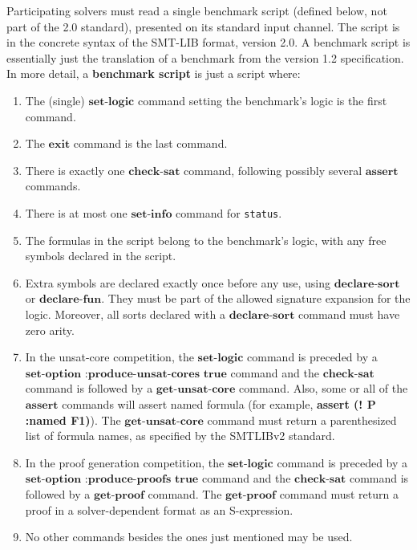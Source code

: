 \documentclass[12pt]{article}
\newcommand{\akey}[1]{\textbf{#1}}
\begin{document}
%
Participating solvers must read a single benchmark script (defined
below, not part of the 2.0 standard), presented on its standard input
channel. The script is in the concrete syntax of the SMT-LIB format,
version 2.0.  A benchmark script is essentially just the translation
of a benchmark from the version 1.2 specification.  In more detail, a
\textbf{benchmark script} is just a script where:

\begin{enumerate}
\item The (single) $\akey{set-logic}$ command setting the benchmark's
logic is the first command.
\item The $\akey{exit}$ command is the last command.
\item There is exactly one $\akey{check-sat}$ command,
following possibly several $\akey{assert}$ commands.
\item There is at most one $\akey{set-info}$ command for \texttt{status}.
\item The formulas in the script belong to the benchmark's logic, with
any free symbols declared in the script.
\item Extra symbols are declared exactly once before any
  use, using $\akey{declare-sort}$
  or $\akey{declare-fun}$.
  They must be part of the allowed signature expansion for the logic.
  Moreover, all sorts declared with a $\akey{declare-sort}$ command must have zero arity.
\item In the unsat-core competition, the $\akey{set-logic}$ command is preceded by a 
$\akey{set-option :produce-unsat-cores true}$ command and the 
$\akey{check-sat}$ command is followed by a $\akey{get-unsat-core}$ command.
Also, some or all of the $\akey{assert}$ commands will assert named formula
(for example, \akey{assert (! P :named F1)}). The $\akey{get-unsat-core}$
command must return a parenthesized list of formula names, as specified by the 
SMTLIBv2 standard.
\item In the proof generation competition, the $\akey{set-logic}$ command is preceded by a 
$\akey{set-option :produce-proofs true}$ command and the 
$\akey{check-sat}$ command is followed by a $\akey{get-proof}$ command.
The $\akey{get-proof}$ command must return a proof in a solver-dependent format as an
S-expression.
\item No other commands besides the ones just mentioned may be used.

\end{enumerate}
\end{document}
